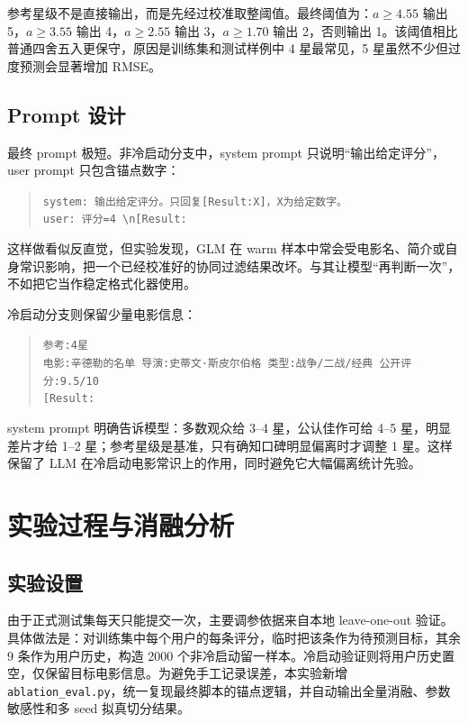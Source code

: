 \documentclass[UTF8,a4paper,10pt,fontset=none]{ctexart}
\begin{document}
参考星级不是直接输出，而是先经过校准取整阈值。最终阈值为：$a\ge4.55$ 输出 5，$a\ge3.55$ 输出 4，$a\ge2.55$ 输出 3，$a\ge1.70$ 输出 2，否则输出 1。该阈值相比普通四舍五入更保守，原因是训练集和测试样例中 4 星最常见，5 星虽然不少但过度预测会显著增加 RMSE。

\subsection{Prompt 设计}

最终 prompt 极短。非冷启动分支中，system prompt 只说明``输出给定评分''，user prompt 只包含锚点数字：

\begin{quote}
\small
\texttt{system: 输出给定评分。只回复[Result:X]，X为给定数字。}\\
\texttt{user: 评分=4 \textbackslash n[Result:}
\end{quote}

这样做看似反直觉，但实验发现，GLM 在 warm 样本中常会受电影名、简介或自身常识影响，把一个已经校准好的协同过滤结果改坏。与其让模型``再判断一次''，不如把它当作稳定格式化器使用。

冷启动分支则保留少量电影信息：

\begin{quote}
\small
\texttt{参考:4星}\\
\texttt{电影:辛德勒的名单 导演:史蒂文·斯皮尔伯格 类型:战争/二战/经典 公开评分:9.5/10}\\
\texttt{[Result:}
\end{quote}

system prompt 明确告诉模型：多数观众给 3--4 星，公认佳作可给 4--5 星，明显差片才给 1--2 星；参考星级是基准，只有确知口碑明显偏离时才调整 1 星。这样保留了 LLM 在冷启动电影常识上的作用，同时避免它大幅偏离统计先验。

\section{实验过程与消融分析}

\subsection{实验设置}

由于正式测试集每天只能提交一次，主要调参依据来自本地 leave-one-out 验证。具体做法是：对训练集中每个用户的每条评分，临时把该条作为待预测目标，其余 9 条作为用户历史，构造 2000 个非冷启动留一样本。冷启动验证则将用户历史置空，仅保留目标电影信息。为避免手工记录误差，本实验新增 \texttt{ablation\_eval.py}，统一复现最终脚本的锚点逻辑，并自动输出全量消融、参数敏感性和多 seed 拟真切分结果。
\end{document}
